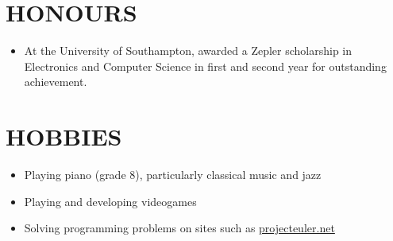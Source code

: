 \documentclass[margin]{res}
\begin{document}
\begin{resume}
\section{HONOURS}
\begin{itemize}
\item At the University of Southampton, awarded a Zepler scholarship in
Electronics and Computer Science in first and second year for outstanding
achievement.
\end{itemize}

\section{HOBBIES}
\begin{itemize}
\item Playing piano (grade 8), particularly classical music and jazz
\item Playing and developing videogames
\item Solving programming problems on sites such as
\href{https://projecteuler.net/}{projecteuler.net}
\end{itemize}

\end{resume}
\end{document}
